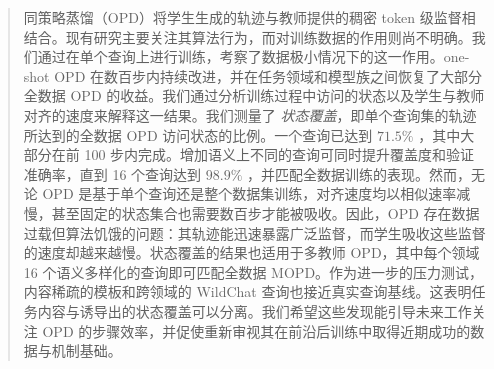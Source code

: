 \begin{abstract}
    同策略蒸馏（OPD）将学生生成的轨迹与教师提供的稠密 token 级监督相结合。现有研究主要关注其算法行为，而对训练数据的作用则尚不明确。我们通过在单个查询上进行训练，考察了数据极小情况下的这一作用。one-shot OPD 在数百步内持续改进，并在任务领域和模型族之间恢复了大部分全数据 OPD 的收益。我们通过分析训练过程中访问的状态以及学生与教师对齐的速度来解释这一结果。我们测量了 \emph{状态覆盖}，即单个查询集的轨迹所达到的全数据 OPD 访问状态的比例。一个查询已达到 \(71.5\%\) ，其中大部分在前 100 步内完成。增加语义上不同的查询可同时提升覆盖度和验证准确率，直到 16 个查询达到 \(98.9\%\) ，并匹配全数据训练的表现。然而，无论 OPD 是基于单个查询还是整个数据集训练，对齐速度均以相似速率减慢，甚至固定的状态集合也需要数百步才能被吸收。因此，OPD 存在数据过载但算法饥饿的问题：其轨迹能迅速暴露广泛监督，而学生吸收这些监督的速度却越来越慢。状态覆盖的结果也适用于多教师 OPD，其中每个领域 16 个语义多样化的查询即可匹配全数据 MOPD。作为进一步的压力测试，内容稀疏的模板和跨领域的 WildChat 查询也接近真实查询基线。这表明任务内容与诱导出的状态覆盖可以分离。我们希望这些发现能引导未来工作关注 OPD 的步骤效率，并促使重新审视其在前沿后训练中取得近期成功的数据与机制基础。
\end{abstract}

